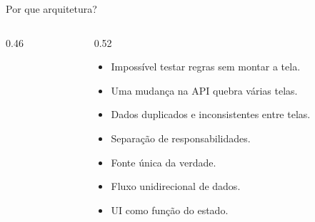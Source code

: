 \documentclass[aspectratio=169,10pt]{beamer}
\begin{document}
\begin{frame}{Por que arquitetura?}
  \begin{columns}[c]
    \begin{column}{0.46\textwidth}
      \centering
    \end{column}
    \begin{column}{0.52\textwidth}
      \begin{erro}
        \begin{itemize}
          \item Impossível testar regras sem montar a tela.
          \item Uma mudança na API quebra várias telas.
          \item Dados duplicados e inconsistentes entre telas.
        \end{itemize}
      \end{erro}
      \begin{conceito}[Princípios]
        \begin{itemize}
          \item Separação de responsabilidades.
          \item Fonte única da verdade.
          \item Fluxo unidirecional de dados.
          \item UI como função do estado.
        \end{itemize}
      \end{conceito}
    \end{column}
  \end{columns}
\end{frame}
\end{document}
